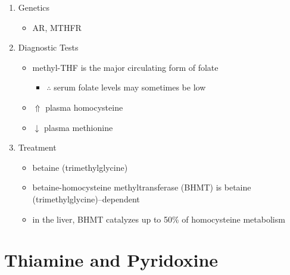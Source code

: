 \documentclass{scrartcl}
\begin{document}
\begin{enumerate}
\item Genetics
\label{sec:org93aa59a}
\begin{itemize}
\item AR, MTHFR
\end{itemize}

\item Diagnostic Tests
\label{sec:org6b377dd}
\begin{itemize}
\item methyl-THF is the major circulating form of folate
\begin{itemize}
\item \(\therefore\) serum folate levels may sometimes be low
\end{itemize}
\item \(\Uparrow\) plasma homocysteine
\item \(\downarrow\) plasma methionine
\end{itemize}

\item Treatment
\label{sec:org1dfa80a}
\begin{itemize}
\item betaine (trimethylglycine)
\item betaine-homocysteine methyltransferase (BHMT) is betaine
(trimethylglycine)–dependent
\end{itemize}
\begin{itemize}
\item in the liver, BHMT catalyzes up to 50\% of homocysteine metabolism
\end{itemize}
\end{enumerate}

\section{Thiamine and Pyridoxine}
\label{sec:org9c84772}
\end{document}
